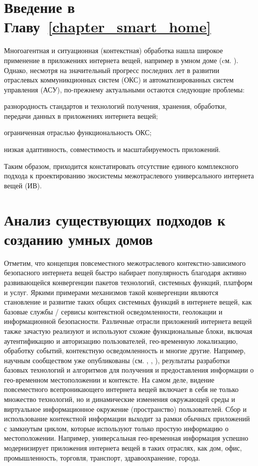 \section*{Введение в Главу~\ref{chapter_smart_home}}

Многоагентная и ситуационная (контекстная) обработка нашла широкое применение в приложениях интернета вещей, например в умном доме (cм. ). Однако, несмотря на значительный прогресс последних лет в развитии отраслевых коммуникционных систем (ОКС) и автоматизированных систем управления (АСУ), по-прежнему актуальными остаются следующие проблемы:
\begin{textitemize}
	\item разнородность стандартов и технологий получения, хранения, обработки, передачи данных в приложениях интернета вещей;
	\item ограниченная отраслью функциональность ОКС;
	\item низкая адаптивность, совместимость и масштабируемость приложений.
\end{textitemize}

Таким образом, приходится констатировать отсутствие единого комплексного подхода к проектированию экосистемы межотраслевого универсального интернета вещей (ИВ).

\section{Анализ существующих подходов к созданию умных домов}
\label{sec_approach_analysis_for_smart_homes_design}

Отметим, что концепция повсеместного межотраслевого контекстно-зависимого безопасного интернета вещей быстро набирает популярность благодаря активно развивающейся конвергенции пакетов технологий, системных функций, платформ и услуг. Яркими примерами механизмов такой конвергенции являются становление и развитие таких общих системных функций в интернете вещей, как базовые службы / сервисы контекстной осведомленности, геолокации и информационной безопасности. Различные отрасли приложений интернета вещей также зачастую реализуют и используют схожие функциональные блоки, включая аутентификацию и авторизацию пользователей, гео-временную локализацию, обработку событий, контекстную осведомленность и многие другие. Например, научным сообществом уже опубликованы (см. , , ), результаты разработки базовых технологий и алгоритмов для получения и предоставления информации о гео-временном местоположении и контексте. На самом деле, видение повсеместного всепроникающего интернета вещей включает в себя не только множество технологий, но и динамические изменения окружающей среды и виртуальное информационное окружение (пространство) пользователей. Сбор и использование контекстной информации выходит за рамки обычных приложений с замкнутым циклом, которые используют только простую информацию о местоположении. Например, универсальная гео-временная информация успешно модернизирует приложения интернета вещей в таких отраслях, как дом, офис, промышленность, торговля, транспорт, здравоохранение, города.

